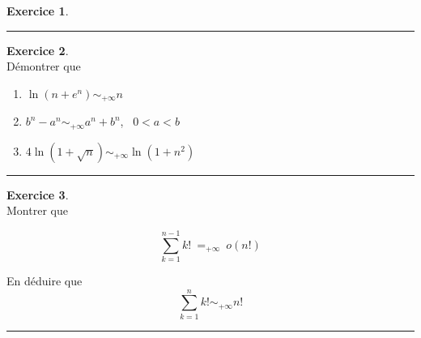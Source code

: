 \documentclass[a4paper,10pt]{article}
\theoremstyle{definition}
\theoremstyle{definition}
\newtheorem{exo}{Exercice}
\begin{document}
\begin{minipage}{1\linewidth}
\begin{minipage}[t]{0.48\linewidth}
\begin{exo}
\centering
\rule{1\linewidth}{0.6pt}
\end{exo}

\begin{exo}\quad\\
Démontrer que  
\begin{enumerate}
\item$ \ln(n+ e^n) \sim_{+\infty} n$
\item $b^n-a^n   \sim_{+\infty} a^n+b^n$, \ $0<a<b$
\item $ 4\ln(1+\sqrt{n}) \sim_{+\infty} \ln(1+n^2)$
\end{enumerate}
\centering
\rule{1\linewidth}{0.6pt}
\end{exo}
\begin{exo}\quad\\
Montrer que  

$$\sum_{k=1}^{n-1}k! \ =_{+\infty} \  o\left(n!\right)$$

En déduire que
$$\sum_{k=1}^{n}k!  \sim_{+\infty} n!$$
\centering
\rule{1\linewidth}{0.6pt}
\end{exo}
\end{minipage}
\end{minipage}
\newpage
\end{document}
